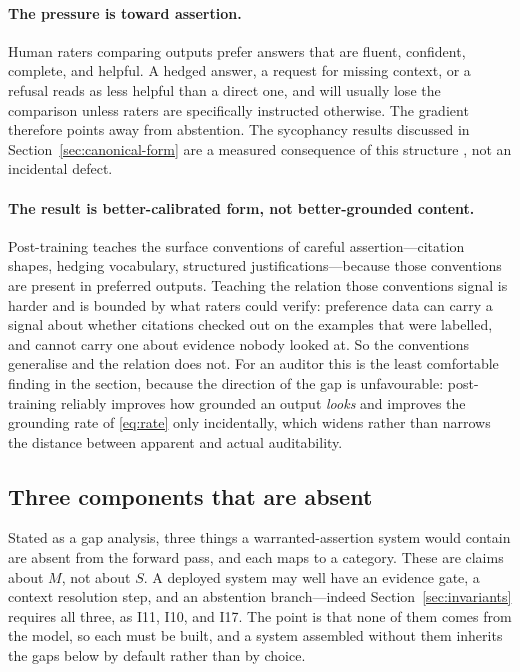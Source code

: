 \documentclass[11pt]{article}
\theoremstyle{plain}
\theoremstyle{definition}
\begin{document}
\paragraph{The pressure is toward assertion.} Human raters comparing outputs
prefer answers that are fluent, confident, complete, and helpful. A hedged answer,
a request for missing context, or a refusal reads as less helpful than a direct
one, and will usually lose the comparison unless raters are specifically
instructed otherwise. The gradient therefore points away from abstention. The
sycophancy results discussed in Section~\ref{sec:canonical-form} are a measured
consequence of this structure \citep{sharma2024}, not an incidental defect.

\paragraph{The result is better-calibrated form, not better-grounded content.}
Post-training teaches the surface conventions of careful assertion---citation
shapes, hedging vocabulary, structured justifications---because those conventions
are present in preferred outputs. Teaching the relation those conventions signal is
harder and is bounded by what raters could verify: preference data can carry a signal
about whether citations checked out on the examples that were labelled, and cannot
carry one about evidence nobody looked at. So the conventions generalise and the
relation does not. For an auditor this is the least comfortable finding in the section,
because the direction of the gap is unfavourable: post-training reliably improves how
grounded an output \emph{looks} and improves the grounding rate of \eqref{eq:rate}
only incidentally, which widens rather than narrows the distance between apparent and
actual auditability.

\subsection{Three components that are absent}
\label{sec:missing}

Stated as a gap analysis, three things a warranted-assertion system would contain
are absent from the forward pass, and each maps to a category. These are claims about
$M$, not about $S$. A deployed system may well have an evidence gate, a context
resolution step, and an abstention branch---indeed Section~\ref{sec:invariants}
requires all three, as I11, I10, and I17. The point is that none of them comes from the
model, so each must be built, and a system assembled without them inherits the gaps
below by default rather than by choice.
\end{document}
